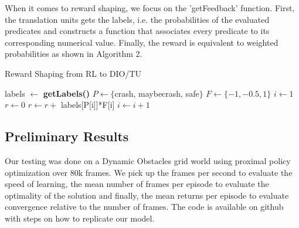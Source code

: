 When it comes to reward shaping, we focus on the 'getFeedback' function. First, the translation units gets 
the labels, i.e. the probabilities of the evaluated predicates and constructs a function that associates 
every predicate to its corresponding numerical value. Finally, the reward is equivalent to weighted probabilities 
as shown in Algorithm 2.

\begin{algorithm}[H]
  \caption{Reward Shaping from RL to DIO/TU}
  \begin{algorithmic}[1]
      
      \State labels $\gets$ \textbf{getLabels()} 
      \State $P \gets \{$crash, maybecrash, safe$\}$  
      \State $F \gets \{-1,-0.5,1\}$ 
      \State $i \gets 1$
      \State $r \gets 0$
         \State $r \gets r +$ labels[P[i]]*F[i] 
         \State $i \gets i+1$


      \EndWhile
      
      \EndProcedure
      
      \end{algorithmic}
      \end{algorithm}

    \subsection{Preliminary Results}
    Our testing was done on a Dynamic Obstacles grid world using proximal policy optimization over 80k frames. 
    We pick up the frames per second to evaluate the speed of learning, the mean number of frames per episode 
    to evaluate the optimality of the solution and finally, the mean returns per episode to evaluate convergence relative 
    to the number of frames. The code is available on github \cite{dio} with steps on how to replicate our model.

